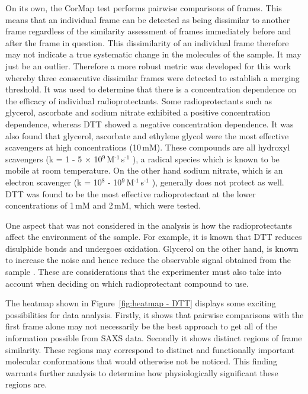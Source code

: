 On its own, the CorMap test performs pairwise comparisons of frames.
This means that an individual frame can be detected as being dissimilar to another frame regardless of the similarity assessment of frames immediately before and after the frame in question.
This dissimilarity of an individual frame therefore may not indicate a true systematic change in the molecules of the sample.
It may just be an outlier.
Therefore a more robust metric was developed for this work whereby three consecutive dissimilar frames were detected to establish a merging threshold.
It was used to determine that there is a concentration dependence on the efficacy of individual radioprotectants. Some radioprotectants such as glycerol, ascorbate and sodium nitrate exhibited a positive concentration dependence, whereas DTT showed a negative concentration dependence.
It was also found that glycerol, ascorbate and ethylene glycol were the most effective scavengers at high concentrations (10$\,$mM).
These compounds are all hydroxyl scavengers (k = 1 - 5 $\times$ 10$^{\text{9}}\,$M$^{\text{-1}}\,$s$^{\text{-1}}$ \cite{garrison1987reaction}), a radical species which is known to be mobile at room temperature.
On the other hand sodium nitrate, which is an electron scavenger (k = 10$^{\text{8}}$ -  10$^{\text{9}}\,$M$^{\text{-1}}\,$s$^{\text{-1}}$ \cite{garrison1987reaction,allan2012}), generally does not protect as well.
DTT was found to be the most effective radioprotectant at the lower concentrations of 1$\,$mM and 2$\,$mM, which were tested.

One aspect that was not considered in the analysis is how the radioprotectants affect the environment of the sample.
For example, it is known that DTT reduces disulphide bonds and undergoes oxidation.
Glycerol on the other hand, is known to increase the noise and hence reduce the observable signal obtained from  the sample \cite{jeffries2015limiting}.
These are considerations that the experimenter must also take into account when deciding on which radioprotectant compound to use.

The heatmap shown in Figure~\ref{fig:heatmap - DTT} displays some exciting possibilities for data analysis.
Firstly, it shows that pairwise comparisons with the first frame alone may not necessarily be the best approach to get all of the information possible from SAXS data.
Secondly it shows distinct regions of frame similarity.
These regions may correspond to distinct and functionally important molecular conformations that would otherwise not be noticed.
This finding warrants further analysis to determine how physiologically significant these regions are.
